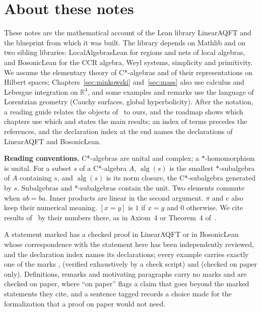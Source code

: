\documentclass[11pt]{article}
\numberwithin{equation}{section}
\newcommand{\motiv}[1]{#1}
\theoremstyle{definition}
\theoremstyle{remark}
\theoremstyle{plain}
\newcommand{\R}{\mathbb R}
\newcommand{\alg}{\operatorname{alg}}
\newcommand{\calg}{\overline{\operatorname{alg}}}
\newcommand{\revg}[1]{#1}  %
\newcommand{\revtag}[1]{#1}  %
\newcommand{\revs}[1]{#1}  %
\begin{document}
\section*{About these notes}
\noindent\motiv{\revs{These notes are the mathematical account of the Lean library LinearAQFT and the
blueprint from which it was built. The library depends on Mathlib and on two sibling libraries:
LocalAlgebrasLean for regions and nets of local algebras, and BosonicLean for the CCR algebra, Weyl
systems, simplicity and primitivity. We assume the elementary theory of C*-algebras and of their
representations on Hilbert spaces; Chapters~\ref{sec:minkowski} and~\ref{sec:mass} also use
calculus and Lebesgue integration on $\R^4$, and some examples and remarks use the language of
Lorentzian geometry (Cauchy surfaces, global hyperbolicity). After the notation, a reading guide
relates the objects of~\cite{dimock} to ours, and the roadmap shows which chapters use which and
states the main results; an index of terms precedes the references,
and the declaration index at the end names the declarations of LinearAQFT and BosonicLean.}}

\medskip
\noindent\motiv{\textbf{Reading conventions.} C*-algebras are unital and complex; a
$*$-homomorphism is unital. For a subset $s$ of a C*-algebra $A$, $\alg(s)$ is the smallest
$*$-subalgebra of $A$ containing $s$, and $\calg(s)$ is its norm closure, the C*-subalgebra
generated by $s$. Subalgebras and $*$-subalgebras contain the unit. Two elements commute when $ab=ba$. Inner
products are linear in the second argument. \revg{$\pi$ and $e$ also keep their numerical
meaning.} $[x=y]$ is $1$ if $x=y$ and $0$ otherwise. \revs{We cite results of~\cite{dimock} by their
numbers there, as in Axiom~4 or Theorem~4 of~\cite{dimock}.}}

\medskip
\noindent\motiv{\revs{A statement marked \revtag{\AQFTLeanTag{}} has a checked proof in LinearAQFT or
in BosonicLean whose correspondence with the statement here has been independently reviewed, and
the declaration index names its declarations; every example carries exactly one of the marks
\AQFTLeanTag{}, \AQFTScriptTag{} (verified exhaustively by a check script) and \AQFTPaperTag{}
(checked on paper only). Definitions, remarks and motivating paragraphs carry no marks and are
checked on paper, where ``on paper'' flags a claim that goes beyond the marked statements they
cite, and a sentence tagged \AQFTArtefactTag{} records a choice made for the formalization that a
proof on paper would not need.}}
\end{document}
